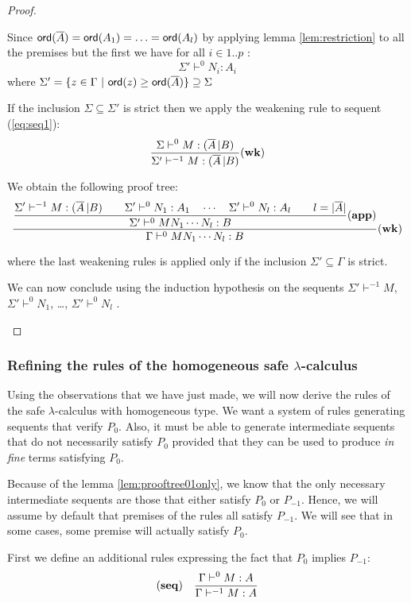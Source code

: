 \begin{proof}
\begin{itemize}
Since ${\sf ord}(\overline{A}) = {\sf ord}(A_1) = \ldots = {\sf ord}(A_l)$ by applying lemma \ref{lem:restriction} to all the premises but the first we have
for all $i \in 1..p$ :
$$ \Sigma' \vdash^0 N_i : A_i $$
where
$\Sigma' = \{ z \in \Gamma \ | \ {\sf ord}(z) \geq {\sf ord}(\overline{A}) \} \supseteq \Sigma$

If the inclusion $\Sigma \subseteq \Sigma'$ is strict then we apply the weakening rule to sequent (\ref{eq:seq1}):
$$ \frac{\displaystyle \Sigma \vdash^0 M : (\overline{A} \, | B)}{\Sigma' \vdash^{-1} M : (\overline{A} \, | B)} \mathbf{(wk)} $$

We obtain the following proof tree:
$$  \frac{\displaystyle 
        \frac{\displaystyle 
            { \Sigma' \vdash^{-1} M : (\overline{A} \, | B)
            \qquad
            \Sigma' \vdash^0 N_1 : A_1 \quad \cdots \quad \Sigma' \vdash^0 N_{l} : A_l \qquad l = |\overline{A}|
            }
        }{
            \Sigma' \vdash^0 M N_1 \cdots N_{l} : B
        } \mathbf{(app)}
    }{
         \Gamma \vdash^0 M N_1 \cdots N_{l} : B
    } \mathbf{(wk)}
$$

where the last weakening rules is applied only if the inclusion $\Sigma' \subseteq \Gamma$ is strict.

We can now conclude using the induction hypothesis on the sequents $\Sigma' \vdash^{-1} M$,
$\Sigma' \vdash^0 N_1$, \ldots, $\Sigma' \vdash^0 N_l$ .
\end{itemize}
\end{proof}

\subsubsection{Refining the rules of the homogeneous safe $\lambda$-calculus}

Using the observations that we have just made, we will now derive the rules
of the safe $\lambda$-calculus with homogeneous type. We want a system
of rules generating sequents that verify $P_0$. Also, it must be able to generate intermediate
sequents that do not necessarily satisfy $P_0$ provided that they can be used
to produce \emph{in fine} terms satisfying $P_0$.

Because of the lemma \ref{lem:prooftree01only}, we know that the only necessary intermediate sequents
are those that either satisfy $P_0$ or $P_{-1}$.
Hence, we will assume by default that premises of the rules all satisfy $P_{-1}$. We will see that in
some cases, some premise will actually satisfy $P_0$.

First we define an additional rules expressing the fact that $P_0$ implies $P_{-1}$:
$$ \mathbf{(seq)} \quad \frac{\displaystyle \Gamma \vdash^{0} M : A}{\Gamma \vdash^{-1} M : A} $$

